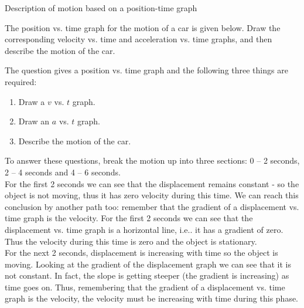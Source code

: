 \begin{wex}{Description of motion based on a position-time graph}{The position vs. time graph for the motion of a car is given below. Draw the corresponding velocity vs. time and acceleration vs. time graphs, and then describe the motion of the car.
\begin{center}
\end{center}
}{%
The question gives a position vs. time graph and the following three things are required:
\begin{enumerate}[label=\textbf{\arabic*}.]
\item Draw a $v$ vs. $t$ graph.
\item Draw an $a$ vs. $t$ graph.
\item Describe the motion of the car.
\end{enumerate}
To answer these questions, break the motion up into three sections: 0 -- 2 seconds, 2 -- 4 seconds and 4 -- 6 seconds.\\

For the first 2 seconds we can see that the displacement remains constant - so the object is not moving, thus it has zero velocity during this time. We can reach this conclusion by another path too: remember that the gradient of a displacement vs. time graph is the velocity. For the first 2 seconds we can see that the displacement vs. time graph is a horizontal line, i.e.. it has a gradient of zero. Thus the velocity during this time is zero and the object is stationary.\\

For the next 2 seconds, displacement is increasing with time so the object is moving. Looking at the gradient of the displacement graph we can see that it is not constant. In fact, the slope is getting steeper (the gradient is increasing) as time goes on. Thus, remembering that the gradient of a displacement vs. time graph is the velocity, the velocity must be increasing with time during this phase.\\

}
\end{wex}
